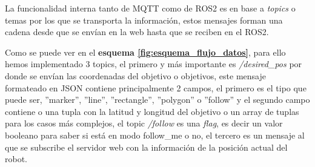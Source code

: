 La funcionalidad interna tanto de MQTT como de ROS2 es en base a \textit{topics} o temas por los que se transporta la información, estos 
mensajes forman una cadena desde que se envían en la web hasta que se reciben en el ROS2.

Como se puede ver en el \textbf{esquema \ref{fig:esquema_flujo_datos}}, para ello hemos implementado 3 topics, el primero y más importante 
es  \textit{/desired\_pos} por donde se envían las coordenadas del objetivo o objetivos, este mensaje formateado en JSON contiene principalmente 2 
campos, el primero es el tipo que puede ser, ''marker'', ''line'', ''rectangle'', ''polygon'' o ''follow'' y el segundo campo contiene o 
una tupla con la latitud y longitud del objetivo o un array de tuplas para los casos más complejos, el topic \textit{/follow} es una \textit{flag}, 
es decir un valor booleano para saber si está en modo follow\_me o no, el tercero es un mensaje al que se subscribe el servidor web con 
la información de la posición actual del robot.

